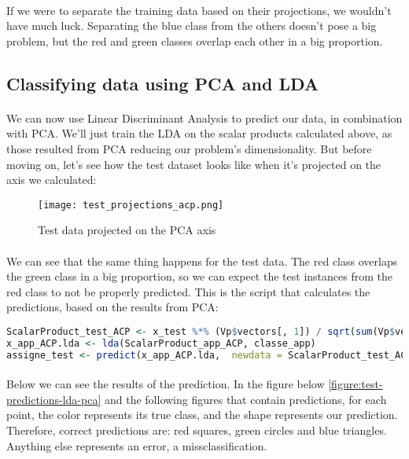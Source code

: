 \paragraph{}
If we were to separate the training data based on their projections, we wouldn't have much luck.
Separating the blue class from the others doesn't pose a big problem, but the red and green classes overlap each other in a big proportion.


\clearpage

\subsection{Classifying data using PCA and LDA}
\paragraph{}
We can now use Linear Discriminant Analysis to predict our data, in combination with PCA.
We'll just train the LDA on the scalar products calculated above, as those resulted from PCA reducing our problem's dimensionality.
But before moving on, let's see how the test dataset looks like when it's projected on the axis we calculated:

\begin{figure}[H]
    \centering
    \texttt{[image: test\_projections\_acp.png]}
    \caption{Test data projected on the PCA axis}
    \label{figure:test-projections}
\end{figure}

\paragraph{}
We can see that the same thing happens for the test data.
The red class overlaps the green class in a big proportion, so we can expect the test instances from the red class to not be properly predicted.
This is the script that calculates the predictions, based on the results from PCA:

\begin{lstlisting}[language=R, caption=Training LDA with PCA]
ScalarProduct_test_ACP <- x_test %*% (Vp$vectors[, 1]) / sqrt(sum(Vp$vectors[, 1] * Vp$vectors[, 1]))
x_app_ACP.lda <- lda(ScalarProduct_app_ACP, classe_app)
assigne_test <- predict(x_app_ACP.lda,  newdata = ScalarProduct_test_ACP)
\end{lstlisting}

\clearpage

\paragraph{}
Below we can see the results of the prediction.
In the figure below \ref{figure:test-predictions-lda-pca} and the following figures that contain predictions, for each point, the color represents its true class, and the shape represents our prediction.
Therefore, correct predictions are: red squares, green circles and blue triangles.
Anything else represents an error, a missclassification.

